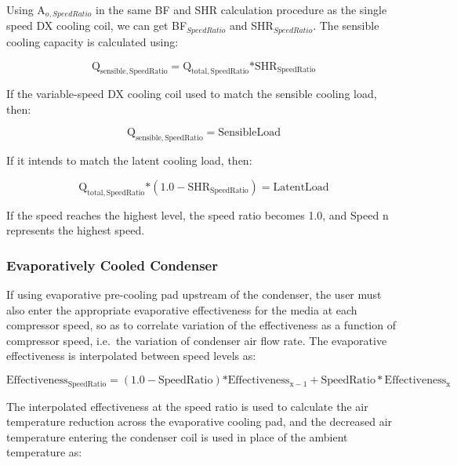 Using A\(_{o,SpeedRatio}\) in the same BF and SHR calculation procedure as the single speed DX cooling coil, we can get BF\(_{SpeedRatio}\) and SHR\(_{SpeedRatio}\).  The sensible cooling capacity is calculated using:

\begin{equation}
{{\mathrm{Q}}_{{\mathrm{sensible}},{\mathrm{SpeedRatio}}}} = {{\mathrm{Q}}_{{\mathrm{total}},{\mathrm{SpeedRatio}}}}{\mathrm{*SH}}{{\mathrm{R}}_{{\mathrm{SpeedRatio}}}}
\end{equation}

If the variable-speed DX cooling coil used to match the sensible cooling load, then:

\begin{equation}
{{\mathrm{Q}}_{{\mathrm{sensible}},{\mathrm{SpeedRatio}}}} = {\mathrm{SensibleLoad}}
\end{equation}

If it intends to match the latent cooling load, then:

\begin{equation}
{{\mathrm{Q}}_{{\mathrm{total}},{\mathrm{SpeedRatio}}}}{\mathrm{*}}\left( {1.0 - {\mathrm{SH}}{{\mathrm{R}}_{{\mathrm{SpeedRatio}}}}} \right) = {\mathrm{LatentLoad}}
\end{equation}

If the speed reaches the highest level, the speed ratio becomes 1.0, and Speed n represents the highest speed.

\subsubsection{Evaporatively Cooled Condenser}\label{evaporatively-cooled-condenser}

If using evaporative pre-cooling pad upstream of the condenser, the user must also enter the appropriate evaporative effectiveness for the media at each compressor speed, so as to correlate variation of the effectiveness as a function of compressor speed, i.e.~the variation of condenser air flow rate. The evaporative effectiveness is interpolated between speed levels as:

\begin{equation}
{\mathrm{Effectivenes}}{{\mathrm{s}}_{{\mathrm{SpeedRatio}}}} = \left( {1.0 - {\mathrm{SpeedRatio}}} \right){\mathrm{*Effectivenes}}{{\mathrm{s}}_{{\mathrm{x}} - 1}} + {\mathrm{SpeedRatio*Effectivenes}}{{\mathrm{s}}_{\mathrm{x}}}
\end{equation}

The interpolated effectiveness at the speed ratio is used to calculate the air temperature reduction across the evaporative cooling pad, and the decreased air temperature entering the condenser coil is used in place of the ambient temperature as:

